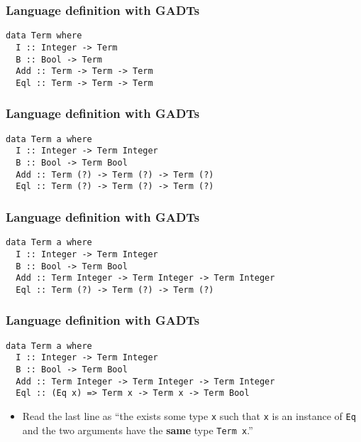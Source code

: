 \documentclass[pdftex,aspectratio=169]{beamer}
\begin{document}
\begin{frame}[fragile]
  \frametitle{Language definition with GADTs}
  \begin{block}{}
    \begin{lstlisting}
data Term where
  I :: Integer -> Term
  B :: Bool -> Term
  Add :: Term -> Term -> Term
  Eql :: Term -> Term -> Term   
    \end{lstlisting}
  \end{block}
\end{frame}

\begin{frame}[fragile]
  \frametitle{Language definition with GADTs}
  \begin{block}{}
    \begin{lstlisting}
data Term a where
  I :: Integer -> Term Integer
  B :: Bool -> Term Bool
  Add :: Term (?) -> Term (?) -> Term (?)
  Eql :: Term (?) -> Term (?) -> Term (?)
    \end{lstlisting}
  \end{block}
\end{frame}

\begin{frame}[fragile]
  \frametitle{Language definition with GADTs}
  \begin{block}{}
    \begin{lstlisting}
data Term a where
  I :: Integer -> Term Integer
  B :: Bool -> Term Bool
  Add :: Term Integer -> Term Integer -> Term Integer
  Eql :: Term (?) -> Term (?) -> Term (?)
    \end{lstlisting}
  \end{block}
\end{frame}

\begin{frame}[fragile]
  \frametitle{Language definition with GADTs}
  \begin{block}{}
    \begin{lstlisting}
data Term a where
  I :: Integer -> Term Integer
  B :: Bool -> Term Bool
  Add :: Term Integer -> Term Integer -> Term Integer
  Eql :: (Eq x) => Term x -> Term x -> Term Bool
    \end{lstlisting}
  \end{block}
  \begin{itemize}
  \item Read the last line as ``the exists some type \lstinline{x}
    such that \lstinline{x} is an instance of \lstinline{Eq} and the
    two arguments have the \textbf{same} type \lstinline{Term x}.''
  \end{itemize}
\end{frame}
\end{document}
